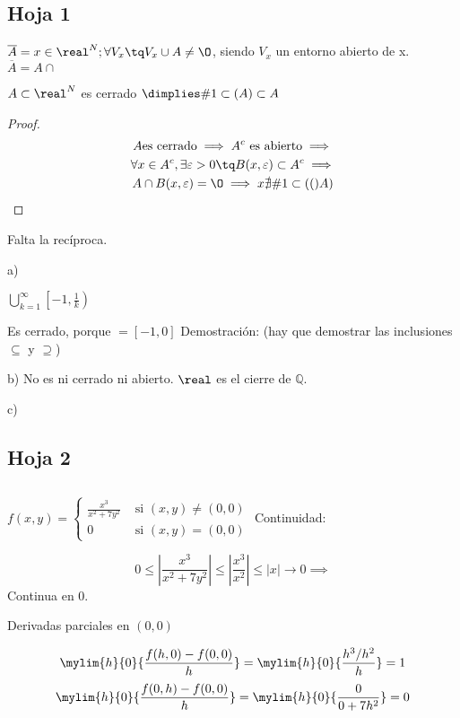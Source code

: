 % 
% 
% 


\subsection{Hoja 1}

$\overline{A} = { x \in \real^N; \forall V_x \tq V_x \cup A \neq \text{\O}}$, siendo $V_x$ un entorno abierto de x.
	$\overline{A} = A \cap $ 
	
\begin{theorem}
$A \subset \real^N$ es cerrado $\dimplies \acum{A}\subset A$ 
\end{theorem}

 

\begin{proof}
\begin{gather*}
A \text{es cerrado} \implies A^c \text{ es abierto} \implies\\
\forall x \in A^c, \exists \varepsilon > 0 \tq B(x,\varepsilon) \subset A^c \implies\\
A \cap B(x,\varepsilon) = \O \implies x \nexists \acum(A) 
\end{gather*}
\end{proof}
Falta la recíproca.

a)

$\displaystyle\bigcup_{k=1}^{\infty} \left[-1,\frac{1}{k}\right)$

Es cerrado, porque $=[-1,0]$
Demostración: (hay que demostrar las inclusiones $\subseteq$ y $\supseteq$)

b)
No es ni cerrado ni abierto.
\obs $\real$ es el cierre de $\mathbb{Q}$.

c)
 

\newpage
\subsection{Hoja 2}

\subsection{}
$f(x,y) = \left\{\begin{matrix}
                \displaystyle \frac{x^3}{x^2+7y^2} & \text{ si } (x,y) \neq (0,0)\\
                 0 & \text{ si } (x,y) = (0,0)
                \end{matrix}\right.$
Continuidad:

$$0\leq \left| \frac{x^3}{x^2+7y^2} \right| \leq \left| \frac{x^3}{x^2} \right| \leq |x| \rightarrow 0 \implies$$ Continua en 0.

Derivadas parciales en $(0,0)$

$$\mylim{h}{0} {\frac{f(h,0) - f(0,0)}{h}} = \mylim{h}{0} {\displaystyle\frac{{h^{3}}/{h^{2}}}{h}} = 1$$
$$\mylim{h}{0} {\frac{f(0,h) - f(0,0)}{h}} = \mylim{h}{0} {\frac{0}{0+7h^2}} = 0$$

% 
